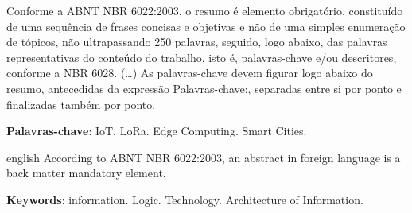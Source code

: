\documentclass[
article,			%
11pt,				%
twoside,			%
a4paper,			%
section=TITLE,		%
onecolumn,          %
english,			%
brazil,				%
sumario=tradicional
]{abntex2}
\begin{document}
    
    
    \begin{resumo}
        Conforme a ABNT NBR 6022:2003, o resumo é elemento obrigatório, constituído de uma sequência de frases concisas e objetivas e não de uma simples enumeração de tópicos, não ultrapassando 250 palavras, seguido, logo abaixo, das palavras representativas do conteúdo do trabalho, isto é, palavras-chave e/ou descritores, conforme a NBR 6028. (\ldots) As palavras-chave devem figurar logo abaixo do resumo, antecedidas da expressão Palavras-chave:, separadas entre si por ponto e finalizadas também por ponto.
        \noindent
        
        \textbf{Palavras-chave}: IoT. LoRa. Edge Computing. Smart Cities.
    \end{resumo}
        
    \renewcommand{\resumoname}{Abstract}
    \begin{resumo}
        \begin{otherlanguage*}{english}
            According to ABNT NBR 6022:2003, an abstract in foreign language is a back
            matter mandatory element.
            
            \noindent
            \textbf{Keywords}: information. Logic. Technology. Architecture of Information.
        \end{otherlanguage*}  
    \end{resumo}
    
    
    \vspace{\onelineskip}%
    
    
    
    \textual
    
\end{document}
